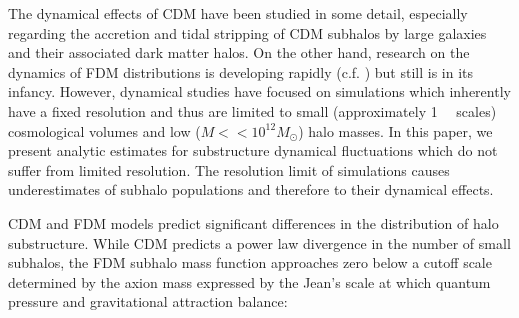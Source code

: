 \documentclass[usenatbib]{mnras}
\begin{document}
\par

The dynamical effects of CDM have been studied in some detail, especially regarding the accretion and tidal stripping of CDM subhalos by large galaxies and their associated dark matter halos. On the other hand, research on the dynamics of FDM distributions is developing rapidly (c.f. \cite{schive_solitons, Schrodinger-Poisson, Schive-virialized-wave-halos}) but still is in its infancy. However, dynamical studies have focused on simulations which inherently have a fixed resolution and thus are limited to small (approximately \SI{1}{\mega \parsec} scales) cosmological volumes and low ($M << 10^{12} M_{\odot}$) halo masses. In this paper, we present analytic estimates for substructure dynamical fluctuations which do not suffer from limited resolution. The resolution limit of simulations causes underestimates of subhalo populations and therefore to their dynamical effects. 
\par 
	CDM and FDM models predict significant differences in the distribution of halo substructure. While CDM predicts a power law divergence in the number of small subhalos, the FDM subhalo mass function approaches zero below a cutoff scale determined by the axion mass expressed by the Jean’s scale at which quantum pressure and gravitational attraction balance:
\setlength{\belowdisplayskip}{4pt} \setlength{\belowdisplayshortskip}{4pt}
\setlength{\abovedisplayskip}{4pt} \setlength{\abovedisplayshortskip}{4pt}
\end{document}
